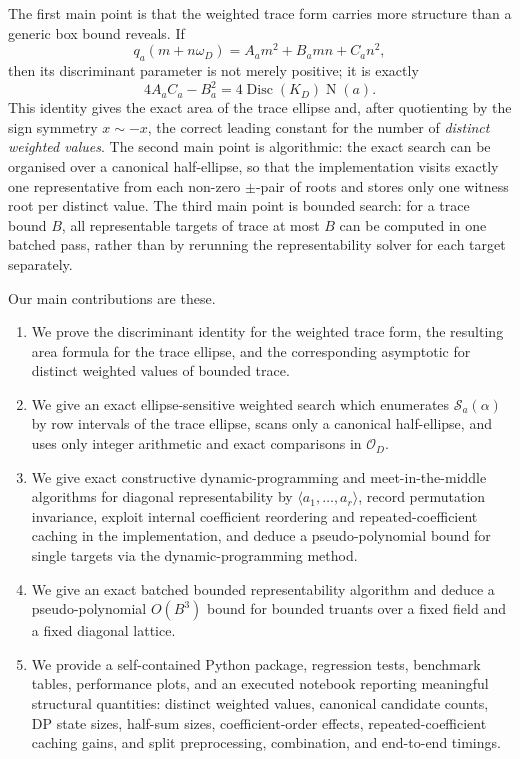 \documentclass[manuscript]{acmart}
\theoremstyle{plain}
\theoremstyle{definition}
\theoremstyle{nonitalicremark}
\newcommand{\OO}{\mathcal{O}}
\newcommand{\OD}{\OO_D}
\newcommand{\N}{\operatorname{N}}
\newcommand{\Disc}{\operatorname{Disc}}
\newcommand{\cS}{\mathcal{S}}
\begin{document}
The first main point is that the weighted trace form carries more structure than a generic box bound
reveals. If
\[
q_a(m+n\omega_D)=A_am^2+B_amn+C_an^2,
\]
then its discriminant parameter is not merely positive; it is exactly
\[
4A_aC_a-B_a^2 = 4\Disc(K_D)\N(a).
\]
This identity gives the exact area of the trace ellipse and, after quotienting by the sign symmetry
$x\sim -x$, the correct leading constant for the number of \emph{distinct weighted values}. The
second main point is algorithmic: the exact search can be organised over a canonical half-ellipse,
so that the implementation visits exactly one representative from each non-zero $\pm$-pair of roots
and stores only one witness root per distinct value. The third main point is bounded search: for a
trace bound $B$, all representable targets of trace at most $B$ can be computed in one batched
pass, rather than by rerunning the representability solver for each target separately.

Our main contributions are these.
\begin{enumerate}[label=\textup{(N\arabic*)},itemsep=0.25em]
\item We prove the discriminant identity for the weighted trace form, the resulting area formula for
the trace ellipse, and the corresponding asymptotic for distinct weighted values of bounded trace.
\item We give an exact ellipse-sensitive weighted search which enumerates $\cS_a(\alpha)$ by row
intervals of the trace ellipse, scans only a canonical half-ellipse, and uses only integer arithmetic
and exact comparisons in $\OD$.
\item We give exact constructive dynamic-programming and meet-in-the-middle algorithms for diagonal
representability by $\langle a_1,\dots,a_r\rangle$, record permutation invariance, exploit internal
coefficient reordering and repeated-coefficient caching in the implementation, and deduce a
pseudo-polynomial bound for single targets via the dynamic-programming method.
\item We give an exact batched bounded representability algorithm and deduce a pseudo-polynomial
$O(B^3)$ bound for bounded truants over a fixed field and a fixed diagonal lattice.
\item We provide a self-contained Python package, regression tests, benchmark tables, performance
plots, and an executed notebook reporting meaningful structural quantities: distinct weighted values,
canonical candidate counts, DP state sizes, half-sum sizes, coefficient-order effects,
repeated-coefficient caching gains, and split preprocessing, combination, and end-to-end timings.
\end{enumerate}
\end{document}
